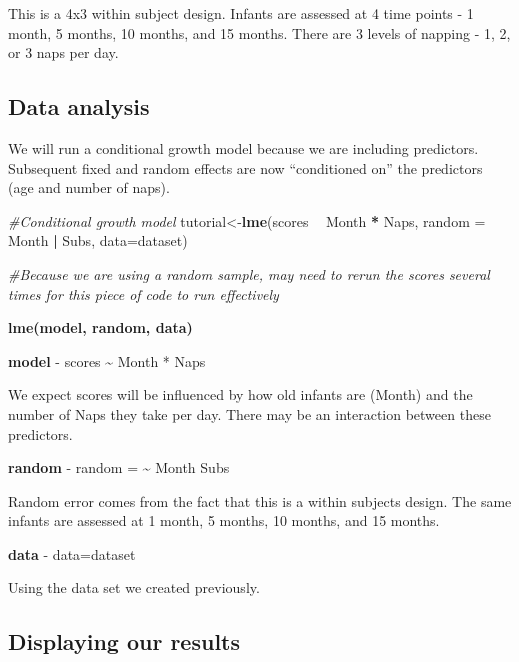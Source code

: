 \documentclass[]{book}
\newenvironment{Shaded}{\begin{snugshade}}{\end{snugshade}}
\newcommand{\CommentTok}[1]{\textcolor[rgb]{0.56,0.35,0.01}{\textit{#1}}}
\newcommand{\DataTypeTok}[1]{\textcolor[rgb]{0.13,0.29,0.53}{#1}}
\newcommand{\KeywordTok}[1]{\textcolor[rgb]{0.13,0.29,0.53}{\textbf{#1}}}
\newcommand{\NormalTok}[1]{#1}
\newcommand{\OperatorTok}[1]{\textcolor[rgb]{0.81,0.36,0.00}{\textbf{#1}}}
\newcommand{\StringTok}[1]{\textcolor[rgb]{0.31,0.60,0.02}{#1}}
\begin{document}
This is a 4x3 within subject design.
Infants are assessed at 4 time points - 1 month, 5 months, 10 months, and 15 months.
There are 3 levels of napping - 1, 2, or 3 naps per day.

\hypertarget{data-analysis}{%
\subsection{Data analysis}\label{data-analysis}}

We will run a conditional growth model because we are including predictors. Subsequent fixed and random effects are now ``conditioned on'' the predictors (age and number of naps).

\begin{Shaded}
\begin{Highlighting}[]
\CommentTok{#Conditional growth model}
\NormalTok{tutorial<-}\KeywordTok{lme}\NormalTok{(scores }\OperatorTok{~}\StringTok{ }\NormalTok{Month }\OperatorTok{*}\StringTok{ }\NormalTok{Naps, }\DataTypeTok{random =} \OperatorTok{~}\StringTok{ }\NormalTok{Month }\OperatorTok{|}\StringTok{ }\NormalTok{Subs, }\DataTypeTok{data=}\NormalTok{dataset)}


\CommentTok{#Because we are using a random sample, may need to rerun the scores several times for this piece of code to run effectively}
\end{Highlighting}
\end{Shaded}

\textbf{lme(model, random, data)}

\textbf{model} - scores \textasciitilde{} Month * Naps

We expect scores will be influenced by how old infants are (Month) and the number of Naps they take per day. There may be an interaction between these predictors.

\textbf{random} - random = \textasciitilde{} Month \textbar{} Subs

Random error comes from the fact that this is a within subjects design. The same infants are assessed at 1 month, 5 months, 10 months, and 15 months.

\textbf{data} - data=dataset

Using the data set we created previously.

\hypertarget{displaying-our-results}{%
\subsection{Displaying our results}\label{displaying-our-results}}
\end{document}
